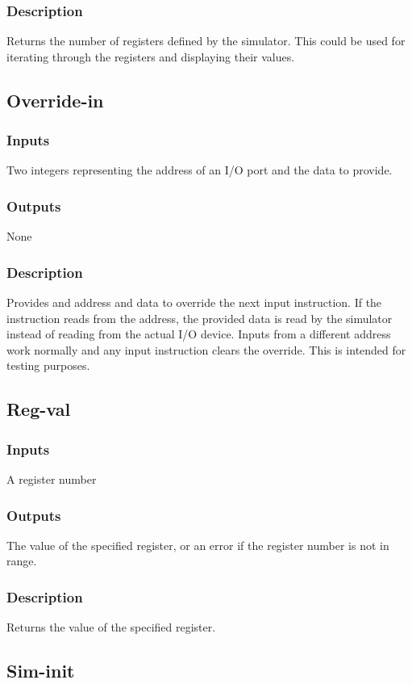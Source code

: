 \documentclass[10pt, openany]{book}
\begin{document}
\subsubsection{Description}
Returns the number of registers defined by the simulator.  This could be used for iterating through the registers and displaying their values.

\subsection{Override-in}
\subsubsection{Inputs}
Two integers representing the address of an I/O port and the data to provide.
\subsubsection{Outputs}
None
\subsubsection{Description}
Provides and address and data to override the next input instruction.  If the instruction reads from the address, the provided data is read by the simulator instead of reading from the actual I/O device.  Inputs from a different address work normally and any input instruction clears the override.  This is intended for testing purposes.

\subsection{Reg-val}
\subsubsection{Inputs}
A register number
\subsubsection{Outputs}
The value of the specified register, or an error if the register number is not in range.
\subsubsection{Description}
Returns the value of the specified register.

\subsection{Sim-init}
\end{document}
